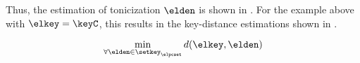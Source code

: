 Thus, the estimation of tonicization $\elden$ is shown in
. For the example above with
$\elkey = \keyC$, this results in the key-distance
estimations shown in
.

\begin{equation}
    \label{eq:tonicization_estimation}
    \min_{\forall \elden \in \setkey_\elpcset} d(\elkey, \elden)
\end{equation}





